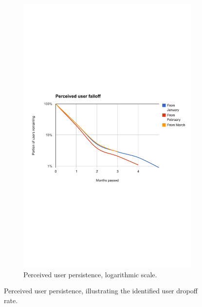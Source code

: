 \begin{figure}[t]
  \begin{subfigure}[t]{\textwidth}
    \includegraphics[width=\textwidth]{Figures/plots/user-dropoff/months-jan-mar-log}
    \caption{Perceived user persistence, logarithmic scale.}
  \end{subfigure}

  \caption{Perceived user persistence, illustrating the identified user dropoff rate.}
  \label{fig:perceived_user_persistence}
\end{figure}
